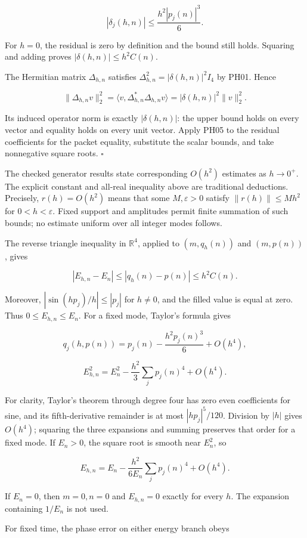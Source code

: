 \[
|\delta_j(h,n)|\le \frac{h^2|p_j(n)|^3}{6}.
\]

For \(h=0\), the residual is zero by definition and the bound still
holds. Squaring and adding proves \(|\delta(h,n)|\le h^2C(n)\).

The Hermitian matrix \(\Delta_{h,n}\) satisfies
\(\Delta_{h,n}^2=|\delta(h,n)|^2I_4\) by PH01. Hence

\[
\|\Delta_{h,n}v\|_2^2
=\langle v,\Delta_{h,n}^*\Delta_{h,n}v\rangle
=|\delta(h,n)|^2\|v\|_2^2.
\]

Its induced operator norm is exactly \(|\delta(h,n)|\): the upper bound
holds on every vector and equality holds on every unit vector. Apply
PH05 to the residual coefficients for the packet equality, substitute
the scalar bounds, and take nonnegative square roots. \(\square\)

The checked generator results state corresponding \(O(h^2)\) estimates
as \(h\to0^+\). The explicit constant and all-real inequality above are
traditional deductions. Precisely, \(r(h)=O(h^2)\) means that some
\(M,\varepsilon>0\) satisfy \(\|r(h)\|\le Mh^2\) for
\(0<h<\varepsilon\). Fixed support and amplitudes permit finite
summation of such bounds; no estimate uniform over all integer modes
follows.

The reverse triangle inequality in \(\mathbb R^4\), applied to
\((m,q_h(n))\) and \((m,p(n))\), gives

\[
|E_{h,n}-E_n|\le|q_h(n)-p(n)|\le h^2C(n).
\]

Moreover, \(|\sin(hp_j)/h|\le|p_j|\) for \(h\ne0\), and the filled value
is equal at zero. Thus \(0\le E_{h,n}\le E_n\). For a fixed mode,
Taylor's formula gives

\[
q_j(h,p(n))=p_j(n)-\frac{h^2p_j(n)^3}{6}+O(h^4),
\]

\[
E_{h,n}^2=E_n^2-\frac{h^2}{3}\sum_jp_j(n)^4+O(h^4).
\]

For clarity, Taylor's theorem through degree four has zero even
coefficients for sine, and its fifth-derivative remainder is at most
\(|hp_j|^5/120\). Division by \(|h|\) gives \(O(h^4)\); squaring the
three expansions and summing preserves that order for a fixed mode. If
\(E_n>0\), the square root is smooth near \(E_n^2\), so

\[
E_{h,n}=E_n-\frac{h^2}{6E_n}\sum_jp_j(n)^4+O(h^4).
\]

If \(E_n=0\), then \(m=0,n=0\) and \(E_{h,n}=0\) exactly for every
\(h\). The expansion containing \(1/E_n\) is not used.

For fixed time, the phase error on either energy branch obeys

